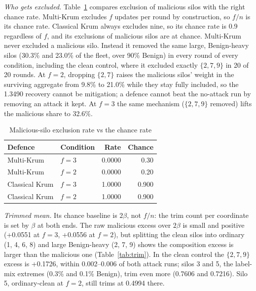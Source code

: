 \emph{Who gets excluded.} Table~\ref{tab:exclusion} compares exclusion of malicious silos
with the right chance rate. Multi-Krum excludes $f$ updates per round by construction,
so $f/n$ is its chance rate. Classical Krum always excludes nine, so its chance rate is
0.9 regardless of $f$, and its exclusions of malicious silos are at chance. Multi-Krum %
never excluded a malicious silo. Instead it removed the same large, Benign-heavy silos
(30.3\% and 23.0\% of the fleet, over 90\% Benign) in every round of every condition, %
including the clean control, where it excluded exactly $\{2,7,9\}$ in 20 of 20 rounds. %
At $f=2$, dropping $\{2,7\}$ raises the malicious silos' weight in the surviving aggregate %
from 9.8\% to 21.0\% while they stay fully included, so the 1.3490 recovery cannot be %
mitigation; a defence cannot beat the no-attack run by removing an attack it kept. At
$f=3$ the same mechanism ($\{2,7,9\}$ removed) lifts the malicious share to 32.6\%. %

\begin{table}[h]
\centering
\caption{Malicious-silo exclusion rate vs the chance rate}
\label{tab:exclusion}
\footnotesize
\begin{tabular}{@{}llrr@{}}
\toprule
Defence & Condition & Rate & Chance\\
\midrule
Multi-Krum & $f=3$ & 0.0000 & 0.30\\ %
Multi-Krum & $f=2$ & 0.0000 & 0.20\\ %
Classical Krum & $f=3$ & 1.0000 & 0.900\\ %
Classical Krum & $f=2$ & 1.0000 & 0.900\\ %
\bottomrule
\end{tabular}
\end{table}

\emph{Trimmed mean.} Its chance baseline is $2\beta$, not $f/n$: the trim count per %
coordinate is set by $\beta$ at both ends. The raw malicious excess over $2\beta$ is %
small and positive (+0.0551 at $f=3$, +0.0556 at $f=2$), but splitting the clean silos %
into ordinary (1, 4, 6, 8) and large Benign-heavy (2, 7, 9) shows the composition excess %
is larger than the malicious one (Table~\ref{tab:trim}). In the clean control the
$\{2,7,9\}$ excess is +0.1726, within 0.002--0.006 of both attack runs; silos 3 and 5, %
the label-mix extremes (0.3\% and 0.1\% Benign), trim even more (0.7606 and 0.7216). %
Silo 5, ordinary-clean at $f=2$, still trims at 0.4994 there. %

